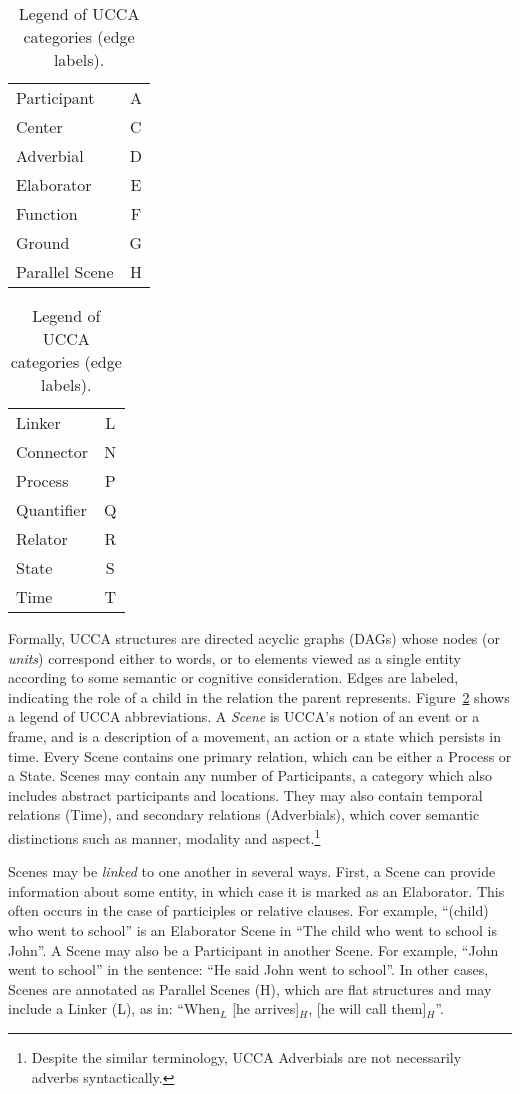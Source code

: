 \documentclass[11pt,a4paper,table]{article}
\begin{document}
  \begin{table}
  \small
  \centering
  \begin{tabular}{lc}
    Participant & A \\
    Center & C \\
    Adverbial & D \\
    Elaborator & E \\
    Function & F \\
    Ground & G \\
    Parallel Scene & H
 \end{tabular}
 \hfill
 \vrule
 \hfill
 \begin{tabular}{lc}
    Linker & L \\
    Connector & N \\
    Process & P \\
    Quantifier & Q \\
    Relator & R \\
    State & S \\
    Time & T
 \end{tabular}
 \caption{Legend of UCCA categories (edge labels).\label{fig:legend}}
 \end{table}

  Formally, UCCA structures are directed acyclic graphs (DAGs) whose nodes (or {\it units}) correspond either to words,
  or to elements viewed as a single entity according to some semantic or cognitive consideration.
  Edges are labeled, indicating the role of a child in the relation the parent represents.
  Figure~\ref{fig:legend} shows a legend of UCCA abbreviations.
  A {\it Scene} is UCCA's notion of an event or a frame, and is a description of a movement, an action or a state which persists in time. 
  Every Scene contains one primary relation, which can be either a Process or a State. 
  Scenes may contain any number of Participants, a category which also includes abstract participants and locations.
  They may also contain temporal relations (Time), and secondary relations (Adverbials), 
  which cover semantic distinctions such as manner, modality and aspect.\footnote{Despite the
  similar terminology, UCCA Adverbials are not necessarily adverbs syntactically.}

  Scenes may be \textit{linked} to one another in several ways.
  First, a Scene can provide information about some entity,
  in which case it is marked as an Elaborator.
  This often occurs in the case of participles or relative clauses.
  For example, ``(child) who went to school'' is an Elaborator Scene
  in ``The child who went to school is John''.
  A Scene may also be a Participant in another Scene. For example, ``John went to school'' in the sentence: ``He said John went to school''. 
  In other cases, Scenes are annotated as Parallel Scenes (H), which are flat structures and may include a Linker (L), 
  as in: ``When$_L$ [he arrives]$_H$, [he will call them]$_H$''.
\end{document}
